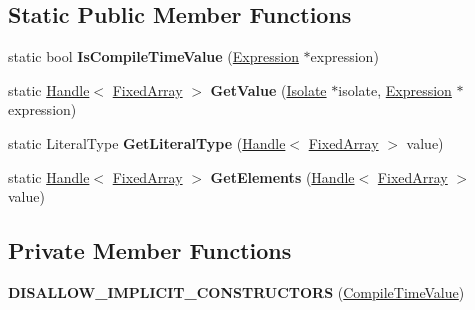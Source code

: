 \subsection*{Static Public Member Functions}
\begin{DoxyCompactItemize}
\item 
static bool {\bfseries Is\+Compile\+Time\+Value} (\hyperlink{classv8_1_1internal_1_1_expression}{Expression} $\ast$expression)\hypertarget{classv8_1_1internal_1_1_compile_time_value_a42f388c360e1cdce36059fd5001ace81}{}\label{classv8_1_1internal_1_1_compile_time_value_a42f388c360e1cdce36059fd5001ace81}

\item 
static \hyperlink{classv8_1_1internal_1_1_handle}{Handle}$<$ \hyperlink{classv8_1_1internal_1_1_fixed_array}{Fixed\+Array} $>$ {\bfseries Get\+Value} (\hyperlink{classv8_1_1internal_1_1_isolate}{Isolate} $\ast$isolate, \hyperlink{classv8_1_1internal_1_1_expression}{Expression} $\ast$expression)\hypertarget{classv8_1_1internal_1_1_compile_time_value_af62ef6f13fc7d3eff0f30e127357a283}{}\label{classv8_1_1internal_1_1_compile_time_value_af62ef6f13fc7d3eff0f30e127357a283}

\item 
static Literal\+Type {\bfseries Get\+Literal\+Type} (\hyperlink{classv8_1_1internal_1_1_handle}{Handle}$<$ \hyperlink{classv8_1_1internal_1_1_fixed_array}{Fixed\+Array} $>$ value)\hypertarget{classv8_1_1internal_1_1_compile_time_value_a3316cc02e00bf91885f42a91e66b7dd8}{}\label{classv8_1_1internal_1_1_compile_time_value_a3316cc02e00bf91885f42a91e66b7dd8}

\item 
static \hyperlink{classv8_1_1internal_1_1_handle}{Handle}$<$ \hyperlink{classv8_1_1internal_1_1_fixed_array}{Fixed\+Array} $>$ {\bfseries Get\+Elements} (\hyperlink{classv8_1_1internal_1_1_handle}{Handle}$<$ \hyperlink{classv8_1_1internal_1_1_fixed_array}{Fixed\+Array} $>$ value)\hypertarget{classv8_1_1internal_1_1_compile_time_value_a0593049ea35745c8f75de40ebd995888}{}\label{classv8_1_1internal_1_1_compile_time_value_a0593049ea35745c8f75de40ebd995888}

\end{DoxyCompactItemize}
\subsection*{Private Member Functions}
\begin{DoxyCompactItemize}
\item 
{\bfseries D\+I\+S\+A\+L\+L\+O\+W\+\_\+\+I\+M\+P\+L\+I\+C\+I\+T\+\_\+\+C\+O\+N\+S\+T\+R\+U\+C\+T\+O\+RS} (\hyperlink{classv8_1_1internal_1_1_compile_time_value}{Compile\+Time\+Value})\hypertarget{classv8_1_1internal_1_1_compile_time_value_ad53bfc7d9f72ac21c5688808daa4e3c5}{}\label{classv8_1_1internal_1_1_compile_time_value_ad53bfc7d9f72ac21c5688808daa4e3c5}

\end{DoxyCompactItemize}
